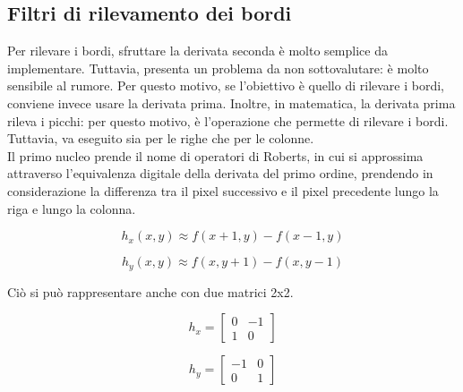 \subsection{Filtri di rilevamento dei bordi}
Per rilevare i bordi, sfruttare la derivata seconda è molto semplice da implementare. Tuttavia, presenta un problema da non sottovalutare: è molto sensibile al rumore. Per questo motivo, se l'obiettivo è quello di rilevare i bordi, conviene invece usare la derivata prima. Inoltre, in matematica, la derivata prima rileva i picchi: per questo motivo, è l'operazione che permette di rilevare i bordi. Tuttavia, va eseguito sia per le righe che per le colonne.\\
Il primo nucleo prende il nome di operatori di Roberts, in cui si approssima attraverso l'equivalenza digitale della derivata del primo ordine, prendendo in considerazione la differenza tra il pixel successivo e il pixel precedente lungo la riga e lungo la colonna.
\begin{center}
\begin{minipage}{0.48\textwidth} %
    \centering
    \begin{equation*}
        h_x(x,y) \approx f(x+1,y) - f(x-1,y)
    \end{equation*}
\end{minipage}
\hfill %
\begin{minipage}{0.48\textwidth} %
    \centering
    \begin{equation*}
        h_y(x,y) \approx f(x,y+1) - f(x,y-1)
    \end{equation*}
\end{minipage}
\end{center}
Ciò si può rappresentare anche con due matrici 2x2.
\begin{center}
\begin{minipage}{0.48\textwidth} %
    \centering
    \begin{equation*}
    h_x=\begin{bmatrix}
        0 & -1 \\
        1 & 0
    \end{bmatrix}
\end{equation*}
\end{minipage}
\hfill %
\begin{minipage}{0.48\textwidth} %
    \centering
    \begin{equation*}
    h_y=\begin{bmatrix}
        -1 & 0 \\
        0 & 1
    \end{bmatrix}
\end{equation*}
\end{minipage}
\end{center}
